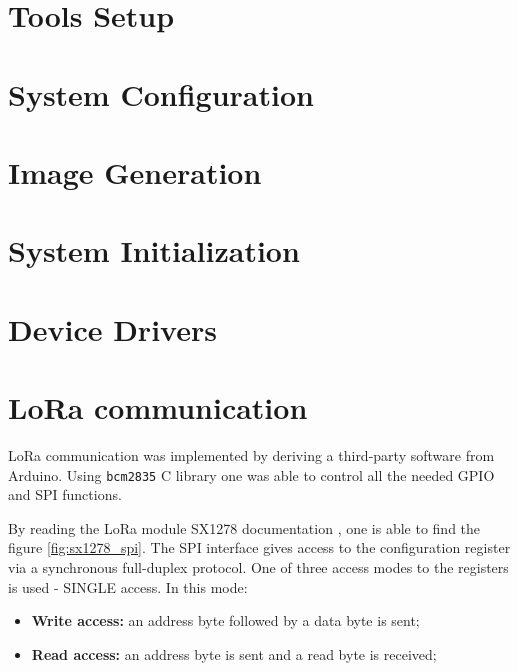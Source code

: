 \section{Tools Setup}


\clearpage
\section{System Configuration}


\clearpage
\section{Image Generation}


\section{System Initialization}


\clearpage
\section{Device Drivers}


\clearpage
\section{LoRa communication}
LoRa communication was implemented by deriving a third-party software from Arduino. \cite{sx1278_lib} Using \verb|bcm2835| C library one was able to control all the needed GPIO and SPI functions. \cite{bcm2835}

By reading the LoRa module SX1278 documentation \cite{sx1278}, one is able to find the figure \ref{fig:sx1278_spi}. The SPI interface gives access to the configuration register via a synchronous full-duplex protocol. One of three access modes to the registers is used - SINGLE access. In this mode:
\begin{itemize}
	\item \textbf{Write access:} an address byte followed by a data byte is sent;
	\item \textbf{Read access:} an address byte is sent and a read byte is received;
\end{itemize}


